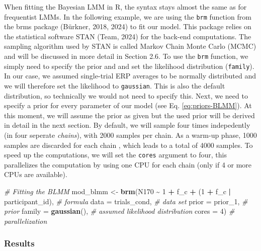 \documentclass[
  doc,12pt,floatsintext]{apa7}
\newenvironment{Shaded}{\begin{snugshade}}{\end{snugshade}}
\newcommand{\AttributeTok}[1]{\textcolor[rgb]{0.13,0.29,0.53}{#1}}
\newcommand{\CommentTok}[1]{\textcolor[rgb]{0.56,0.35,0.01}{\textit{#1}}}
\newcommand{\DecValTok}[1]{\textcolor[rgb]{0.00,0.00,0.81}{#1}}
\newcommand{\FunctionTok}[1]{\textcolor[rgb]{0.13,0.29,0.53}{\textbf{#1}}}
\newcommand{\NormalTok}[1]{#1}
\newcommand{\OtherTok}[1]{\textcolor[rgb]{0.56,0.35,0.01}{#1}}
\newcommand{\SpecialCharTok}[1]{\textcolor[rgb]{0.81,0.36,0.00}{\textbf{#1}}}
\begin{document}
When fitting the Bayesian LMM in R, the syntax stays almost the same as for frequentist LMMs. In the following example, we are using the \texttt{brm} function from the brms package (Bürkner, 2018, 2024) to fit our model. This package relies on the statistical software STAN (Team, 2024) for the back-end computations. The sampling algorithm used by STAN is called Markov Chain Monte Carlo (MCMC) and will be discussed in more detail in Section 2.6. To use the \texttt{brm} function, we simply need to specify the prior and and set the likelihood distribution (\texttt{family}). In our case, we assumed single-trial ERP averages to be normally distributed and we will therefore set the likelihood to \texttt{gaussian}. This is also the default distribution, so technically we would not need to specify this. Next, we need to specify a prior for every parameter of our model (see Eq. \eqref{eq:priors-BLMM}). At this moment, we will assume the prior as given but the used prior will be derived in detail in the next section. By default, we will sample four times indepedently (in four seperate \emph{chains}), with 2000 samples per chain. As a warm-up phase, 1000 samples are discarded for each chain , which leads to a total of 4000 samples. To speed up the computations, we will set the \texttt{cores} argument to four, this parallelizes the computation by using one CPU for each chain (only if 4 or more CPUs are available).

\begin{Shaded}
\begin{Highlighting}[]
\CommentTok{\# Fitting the BLMM}
\NormalTok{mod\_blmm }\OtherTok{\textless{}{-}} \FunctionTok{brm}\NormalTok{(N170 }\SpecialCharTok{\textasciitilde{}} \DecValTok{1} \SpecialCharTok{+}\NormalTok{ f\_c }\SpecialCharTok{+}\NormalTok{ (}\DecValTok{1} \SpecialCharTok{+}\NormalTok{ f\_c }\SpecialCharTok{|}\NormalTok{ participant\_id), }\CommentTok{\# formula}
                \AttributeTok{data =}\NormalTok{ trials\_cond, }\CommentTok{\# data set}
                \AttributeTok{prior =}\NormalTok{ prior\_1, }\CommentTok{\# prior}
                \AttributeTok{family =} \FunctionTok{gaussian}\NormalTok{(), }\CommentTok{\# assumed likelihood distribution}
                \AttributeTok{cores =} \DecValTok{4}\NormalTok{) }\CommentTok{\# parallelization}
\end{Highlighting}
\end{Shaded}

\subsubsection{Results}\label{results-1}
\end{document}
